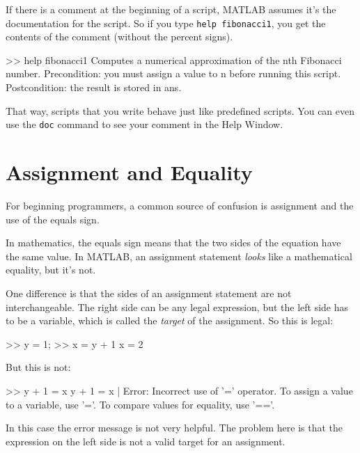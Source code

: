 
If there is a comment at the beginning of a script, MATLAB assumes
it's the documentation for the script. So if you type \lstinline{help fibonacci1}, you get the contents of the comment (without the percent
signs).

\begin{code}
>> help fibonacci1
  Computes a numerical approximation of the nth Fibonacci number.
  Precondition: you must assign a value to n before running this script.
  Postcondition: the result is stored in ans.
\end{code}

That way, scripts that you write behave just like predefined scripts.
You can even use the \lstinline{doc} command to see your comment in the
Help Window.


\section{Assignment and Equality}

For beginning programmers, a common source of confusion is assignment and the use of the equals sign.


In mathematics, the equals sign means that the two sides of the
equation have the same value.
In MATLAB, an assignment statement \emph{looks} like a mathematical equality, but it's not.

One difference is that the sides of an assignment statement are not
interchangeable.  The right side can be any legal expression, but
the left side has to be a variable, which is called the
\emph{target} of the assignment.  So this is legal:

\begin{code}
>> y = 1;
>> x = y + 1
x = 2
\end{code}

But this is not:

\begin{code}
>> y + 1 = x
 y + 1 = x
       |
Error: Incorrect use of '=' operator.
To assign a value to a variable, use '='.
To compare values for equality, use '=='.
\end{code}

In this case the error message is not very helpful.  The problem here is that the expression on the left side is not a valid target for an assignment.

